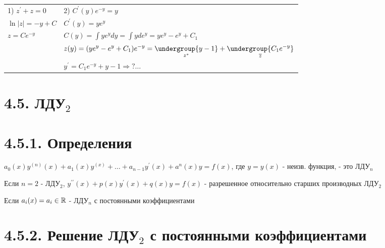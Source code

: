 \documentclass[12pt]{article}
\begin{document}
    \begin{tabular}{p{5cm}p{10cm}}
        1) $\displaystyle z^\prime + z = 0$ & 2) $\displaystyle C^\prime (y) e^{-y} = y$                                                                                              \\

        $\ln|z| = -y + C$     & $\displaystyle C^\prime (y) = ye^{y}$                                                                                                   \\

        $\displaystyle z = Ce^{-y}$         & $\displaystyle C(y) = \int y e^y dy = \int y de^y = ye^y - e^y + C_1$                                                                   \\

        & $\displaystyle z(y) = (ye^y - e^y + C_1)e^{-y} = \underset{z^*}{\undergroup{y - 1}} + \underset{\overline{z}}{\undergroup{C_1 e^{-y}}}$ \\

        & $\displaystyle y^\prime = C_1 e^{-y} + y - 1 \Longrightarrow ? \dots $

    \end{tabular}


    \section{4.5. ЛДУ$\displaystyle _2$}


    \section{4.5.1. Определения}

    \Def $\displaystyle a_0(x) y^{(n)}(x) + a_1(x)y^{(x)} + \dots + a_{n - 1}y^\prime(x) + a^n(x)y = f(x)$, где $y = y(x)$ - неизв. функция, - это ЛДУ$\displaystyle _n$

    \Nota Если $n = 2$ - ЛДУ$\displaystyle _2$, $\displaystyle y^{\prime\prime}(x) + p(x)y^\prime(x) + q(x)y = f(x)$ - разрешенное относительно старших производных ЛДУ$\displaystyle _2$

    \Nota Если $\displaystyle a_i(x) = a_i \in \mathbb{R}$ - ЛДУ$\displaystyle _n$ с постоянными коэффициентами


    \section{4.5.2. Решение ЛДУ$\displaystyle _2$ с постоянными коэффициентами}
\end{document}
